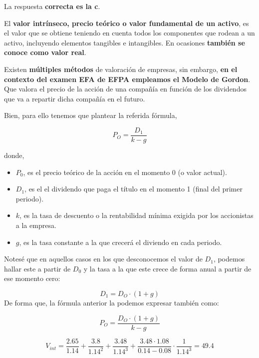 \documentclass[
  letterpaper,
  DIV=11,
  numbers=noendperiod]{scrreprt}
\begin{document}
\begin{tcolorbox}[enhanced jigsaw, left=2mm, opacityback=0, colback=white, breakable, arc=.35mm, bottomrule=.15mm, rightrule=.15mm, toprule=.15mm, leftrule=.75mm, colframe=quarto-callout-tip-color-frame]
\begin{minipage}[t]{5.5mm}
\textcolor{quarto-callout-tip-color}{\faLightbulb}
\end{minipage}%
\begin{minipage}[t]{\textwidth - 5.5mm}

La respuesta \textbf{correcta es la c}.

El \textbf{valor intrínseco, precio teórico o valor fundamental de un
activo}, es el valor que se obtiene teniendo en cuenta todos los
componentes que rodean a un activo, incluyendo elementos tangibles e
intangibles. En ocasiones \textbf{también se conoce como valor real}.

Existen \textbf{múltiples métodos} de valoración de empresas, sin
embargo, \textbf{en el contexto del examen EFA de EFPA empleamos el
Modelo de Gordon}. Que valora el precio de la acción de una compañía en
función de los dividendos que va a repartir dicha compañía en el futuro.

Bien, para ello tenemos que plantear la referida fórmula,

\[P_O=\frac{D_1}{k-g}\]

donde,

\begin{itemize}
\item
  \(P_0\), es el precio teórico de la acción en el momento 0 (o valor
  actual).
\item
  \(D_1\), es el el dividendo que paga el título en el momento 1 (final
  del primer periodo).
\item
  \(k\), es la tasa de descuento o la rentabilidad mínima exigida por
  los accionistas a la empresa.
\item
  \(g\), es la tasa constante a la que crecerá el diviendo en cada
  periodo.
\end{itemize}

Notesé que en aquellos casos en los que desconocemos el valor de
\(D_1\), podemos hallar este a partir de \(D_0\) y la tasa a la que este
crece de forma anual a partir de ese momento cero:

\[D_1={D_O}\cdot ({1+g})\] De forma que, la fórmula anterior la podemos
expresar también como:

\[P_O=\frac{{D_O}\cdot ({1+g})}{k-g}\]

\[V_{int}=\frac{2.65}{1.14}+\frac{3.8}{1.14^2}+\frac{3.48}{1.14^3}+\frac{3.48\cdot1.08}{0.14-0.08}\cdot\frac{1}{1.14^3}=49.4\]

\end{minipage}%
\end{tcolorbox}
\end{document}

